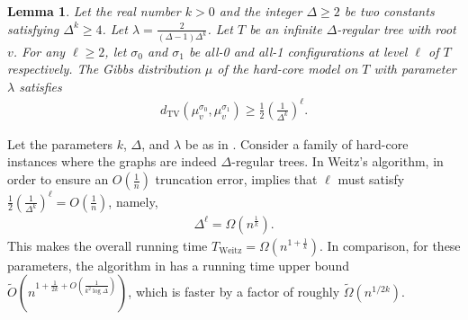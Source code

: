 \documentclass[11pt,a4paper]{amsart}
\newcommand{\tp}[1]{{\left( #1 \right)}}
\newtheorem{lemma}[theorem]{Lemma}
\theoremstyle{definition}
\theoremstyle{remark}
\newcommand{\dTV}{d_{\mathrm{TV}}}
\begin{document}
\begin{lemma}\label{lemma-inf-lower}
Let the real number $k > 0$ and the integer $\Delta \geq 2$ be two constants satisfying $\Delta^k \geq 4$.
Let  $\lambda = \frac{2}{(\Delta - 1)\Delta^{k}}$.
Let $T$ be an infinite $\Delta$-regular tree with root $v$.
For any $\ell \geq 2$, let $\sigma_0$ and $\sigma_1$ be all-0 and all-1 configurations at level $\ell$ of $T$ respectively.
The Gibbs distribution $\mu$ of the hard-core model on $T$ with parameter $\lambda$ satisfies 
\begin{align*}
	\dTV(\mu_v^{\sigma_0},\mu_v^{\sigma_1}) \geq \frac{1}{2}\tp{\frac{1}{\Delta^k}}^{\ell}.
\end{align*}
\end{lemma}

Let the parameters $k$, $\Delta$, and $\lambda$ be as in .
%
Consider a family of hard-core instances where the graphs are indeed $\Delta$-regular trees.
%
In Weitz's algorithm, in order to ensure an $O(\frac{1}{n})$ truncation error,
 implies that $\ell$ must satisfy $\frac{1}{2}\tp{\frac{1}{\Delta^k}}^{\ell} = O(\frac{1}{n})$,
namely,
\begin{align*}
	\Delta^\ell = \Omega(n^{\frac{1}{k}}).
\end{align*}
This makes the overall running time $T_{\mathrm{Weitz}}  = \Omega(n^{1 + \frac{1}{k}})$.
In comparison, for these parameters, the algorithm in  has a running time upper bound $\widetilde{O}\left(n^{1+\frac{1}{2k}+O(\frac{1}{k^2\log\Delta})}\right)$,
which is faster by a factor of roughly $\widetilde{\Omega}(n^{1/2k})$.


\end{document}
